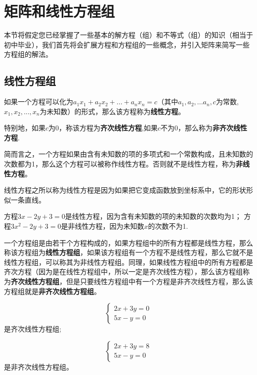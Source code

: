 \section{矩阵和线性方程组}
本节将假定您已经掌握了一些基本的解方程（组）和不等式（组）的知识（相当于初中毕业），我们首先将会扩展方程和方程组的一些概念，并引入矩阵来简写一些方程组的解法。
\subsection{线性方程组}
\begin{definition}
    如果一个方程可以化为$a_1x_1+a_2x_2+...+a_nx_n=c$（其中$a_1,a_2,...a_n,c$为常数,$x_1,x_2,...,x_n$为未知数）的形式，那么该方程称为\textbf{线性方程}。

    特别地，如果$c$为0，称该方程为\textbf{齐次线性方程},如果$c$不为0，那么称为\textbf{非齐次线性方程}.
\end{definition}
简而言之，一个方程如果由含有未知数的项的多项式和一个常数构成，且未知数的次数都为1，那么这个方程可以被称作线性方程。否则就不是线性方程，称为\textbf{非线性方程}。

线性方程之所以称为线性方程是因为如果把它变成函数放到坐标系中，它的形状形似一条直线。

\begin{example}
方程$3x-2y+3=0$是线性方程，因为含有未知数的项的未知数的次数均为1；
方程$3x^2-2y+3=0$是非线性方程，因为未知数$x$的次数不为1.
\end{example}

一个方程组是由若干个方程构成的，如果方程组中的所有方程都是线性方程，那么称该方程组为\textbf{线性方程组}，如果该方程组有一个方程不是线性方程，那么它就不是线性方程组，可以称其为非线性方程组。同理，如果线性方程组中的所有方程都是齐次方程（因为是在线性方程组中，所以一定是齐次线性方程），那么该方程组称为\textbf{齐次线性方程组}，但是只要线性方程组中有一个方程是非齐次线性方程，那么该方程组就是\textbf{非齐次线性方程组}。

\begin{example}
    \begin{equation}
        \begin{cases}
            2x+3y=0 \\
            5x-y=0
        \end{cases}
    \end{equation}
    是齐次线性方程组;

    \begin{equation}
        \begin{cases}
            2x+3y=8 \\
            5x-y=0
        \end{cases}
    \end{equation}
    是非齐次线性方程组。
\end{example}

